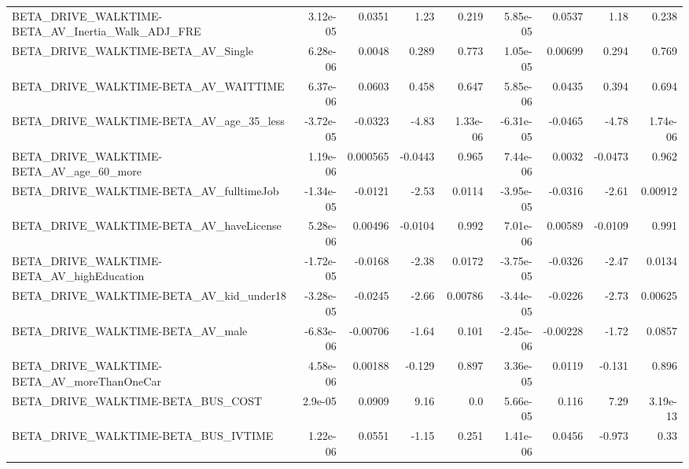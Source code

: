 \begin{tabular}{lrrrrrrrr}
BETA\_DRIVE\_WALKTIME-BETA\_AV\_Inertia\_Walk\_ADJ\_FRE   &    3.12e-05 &       0.0351 &     1.23 &    0.219 &   5.85e-05 &      0.0537 &         1.18 &         0.238 \\
BETA\_DRIVE\_WALKTIME-BETA\_AV\_Single                 &    6.28e-06 &       0.0048 &    0.289 &    0.773 &   1.05e-05 &     0.00699 &        0.294 &         0.769 \\
BETA\_DRIVE\_WALKTIME-BETA\_AV\_WAITTIME               &    6.37e-06 &       0.0603 &    0.458 &    0.647 &   5.85e-06 &      0.0435 &        0.394 &         0.694 \\
BETA\_DRIVE\_WALKTIME-BETA\_AV\_age\_35\_less            &   -3.72e-05 &      -0.0323 &    -4.83 & 1.33e-06 &  -6.31e-05 &     -0.0465 &        -4.78 &      1.74e-06 \\
BETA\_DRIVE\_WALKTIME-BETA\_AV\_age\_60\_more            &    1.19e-06 &     0.000565 &  -0.0443 &    0.965 &   7.44e-06 &      0.0032 &      -0.0473 &         0.962 \\
BETA\_DRIVE\_WALKTIME-BETA\_AV\_fulltimeJob            &   -1.34e-05 &      -0.0121 &    -2.53 &   0.0114 &  -3.95e-05 &     -0.0316 &        -2.61 &       0.00912 \\
BETA\_DRIVE\_WALKTIME-BETA\_AV\_haveLicense            &    5.28e-06 &      0.00496 &  -0.0104 &    0.992 &   7.01e-06 &     0.00589 &      -0.0109 &         0.991 \\
BETA\_DRIVE\_WALKTIME-BETA\_AV\_highEducation          &   -1.72e-05 &      -0.0168 &    -2.38 &   0.0172 &  -3.75e-05 &     -0.0326 &        -2.47 &        0.0134 \\
BETA\_DRIVE\_WALKTIME-BETA\_AV\_kid\_under18            &   -3.28e-05 &      -0.0245 &    -2.66 &  0.00786 &  -3.44e-05 &     -0.0226 &        -2.73 &       0.00625 \\
BETA\_DRIVE\_WALKTIME-BETA\_AV\_male                   &   -6.83e-06 &     -0.00706 &    -1.64 &    0.101 &  -2.45e-06 &    -0.00228 &        -1.72 &        0.0857 \\
BETA\_DRIVE\_WALKTIME-BETA\_AV\_moreThanOneCar         &    4.58e-06 &      0.00188 &   -0.129 &    0.897 &   3.36e-05 &      0.0119 &       -0.131 &         0.896 \\
BETA\_DRIVE\_WALKTIME-BETA\_BUS\_COST                  &     2.9e-05 &       0.0909 &     9.16 &      0.0 &   5.66e-05 &       0.116 &         7.29 &      3.19e-13 \\
BETA\_DRIVE\_WALKTIME-BETA\_BUS\_IVTIME                &    1.22e-06 &       0.0551 &    -1.15 &    0.251 &   1.41e-06 &      0.0456 &       -0.973 &          0.33 \\

\end{tabular}
